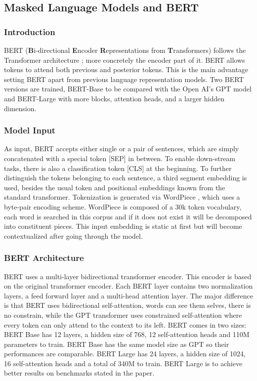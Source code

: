 \documentclass[11pt, a4paper]{amsart}
\begin{document}
\subsection{Masked Language Models and BERT}

\subsubsection{Introduction}

BERT (\textbf{B}i-directional \textbf{E}ncoder \textbf{R}epresentations from \textbf{T}ransformers) follows the Transformer architecture \cite{DBLP:journals/corr/VaswaniSPUJGKP17}; more concretely the encoder part of it. 
BERT allows tokens to attend both previous and posterior tokens. 
This is the main advantage setting BERT apart from previous language representation models. 
Two BERT versions are trained, BERT-Base to be compared with the Open AI's GPT model and BERT-Large with more blocks, attention heads, and a larger hidden dimension.

\subsubsection{Model Input}

As input, BERT accepts either single or a pair of sentences, which are simply concatenated with a special token [SEP] in between.
To enable down-stream tasks, there is also a classification token [CLS] at the beginning.
To further distinguish the tokens belonging to each sentence, a third segment embedding is used, besides the usual token and positional embeddings known from the standard transformer. 
Tokenization is generated via WordPiece \cite{wu2016google}, which uses a byte-pair encoding scheme. 
WordPiece is composed of a 30k token vocabulary, each word is searched in this corpus and if it does not exist it will be decomposed into constituent pieces. 
This input embedding is static at first but will become contextualized after going through the model.

\subsubsection {BERT Architecture}

BERT uses a multi-layer bidirectional transformer encoder. 
This encoder is based on the original transformer encoder. 
Each BERT layer contains two normalization layers, a feed forward layer and a multi-head attention layer. 
The major difference is that BERT uses bidirectional self-attention, words can see them selves, there is no constrain, while the GPT transformer uses constrained self-attention where every token can only attend to the context to its left. 
BERT comes in two sizes:
BERT Base has 12 layers, a hidden size of 768, 12 self-attention heads and 110M parameters to train. 
BERT Base has the same model size as GPT so their performances are comparable. 
BERT Large has 24 layers, a hidden size of 1024, 16 self-attention heads and a total of 340M to train. 
BERT Large is to achieve better results on benchmarks stated in the paper.
\end{document}
